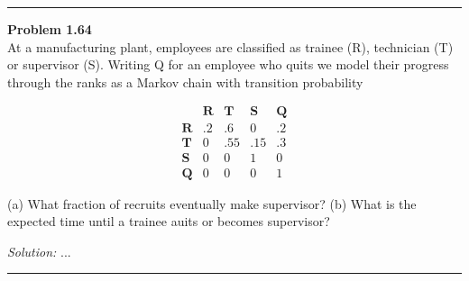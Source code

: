 \documentclass[a4paper, 11pt]{article}
\newenvironment{problem}[2][Problem]
    { \begin{mdframed}[backgroundcolor=gray!20] \textbf{#1 #2} \\}
    {  \end{mdframed}}
\newenvironment{solution}
    {\textit{Solution:}}
    {}
\begin{document}
\noindent\rule{7in}{2.8pt}

\begin{problem}{1.64}
At a manufacturing plant, employees are classified as trainee (R), technician (T) or supervisor (S). Writing Q for an employee who quits we model their progress through the ranks as a Markov chain with transition probability

$$\begin{array}{lllll} 
\ & \mathbf{R} & \mathbf{T} & \mathbf{S} & \mathbf{Q} \\
\mathbf{R} & .2 & .6 & 0 & .2 \\
\mathbf{T} & 0 & .55 & .15 & .3 \\
\mathbf{S} & 0 & 0 & 1 & 0 \\
\mathbf{Q} & 0 & 0 & 0 & 1
\end{array}$$

(a) What fraction of recruits eventually make supervisor? (b) What is the expected time until a trainee auits or becomes supervisor?
\end{problem}
\begin{solution}
...
\end{solution} 

\noindent\rule{7in}{2.8pt}
\end{document}
